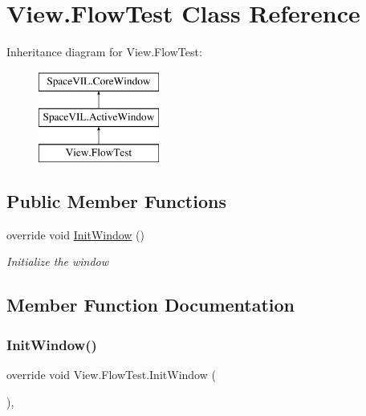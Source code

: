 \hypertarget{class_view_1_1_flow_test}{}\section{View.\+Flow\+Test Class Reference}
\label{class_view_1_1_flow_test}
Inheritance diagram for View.\+Flow\+Test\+:\begin{figure}[H]
\begin{center}
\leavevmode
\includegraphics[height=3.000000cm]{class_view_1_1_flow_test}
\end{center}
\end{figure}
\subsection*{Public Member Functions}
\begin{DoxyCompactItemize}
\item 
override void \mbox{\hyperlink{class_view_1_1_flow_test_abf842c8c39e43a9d0e4b160b04084f90}{Init\+Window}} ()
\begin{DoxyCompactList}\small\item\em Initialize the window \end{DoxyCompactList}\end{DoxyCompactItemize}


\subsection{Member Function Documentation}
\mbox{\label{class_view_1_1_flow_test_abf842c8c39e43a9d0e4b160b04084f90}} 
\subsubsection{\texorpdfstring{Init\+Window()}{InitWindow()}}
{\footnotesize\ttfamily override void View.\+Flow\+Test.\+Init\+Window (\begin{DoxyParamCaption}{ }\end{DoxyParamCaption})\hspace{0.3cm}{\ttfamily [inline]}, {\ttfamily [virtual]}}




